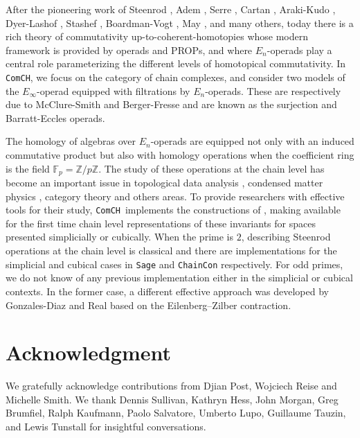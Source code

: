 \documentclass{amsart}
\newcommand{\comch}{\texttt{ComCH}}
\begin{document}
After the pioneering work of Steenrod \cite{Steenrod47, Steenrod62}, Adem \cite{Adem52}, Serre \cite{Serre53}, Cartan \cite{Cartan55}, Araki-Kudo \cite{ArakiKudo56}, Dyer-Lashof \cite{DyerLashof62}, Stashef \cite{Stasheff63}, Boardman-Vogt \cite{BoardmanVogt73}, May \cite{May70algebraic, May72geometry}, and many others, today there is a rich theory of commutativity up-to-coherent-homotopies whose modern framework is provided by operads and PROPs, and where $E_n$-operads play a central role parameterizing the different levels of homotopical commutativity. In \comch, we focus on the category of chain complexes, and consider two models of the $E_\infty$-operad equipped with filtrations by $E_n$-operads. These are respectively due to McClure-Smith \cite{McClureSmith03} and Berger-Fresse \cite{BergerFresse04} and are known as the surjection and Barratt-Eccles operads.

The homology of algebras over $E_n$-operads are equipped not only with an induced commutative product but also with homology operations when the coefficient ring is the field $\mathbb F_p = \mathbb Z/ p\mathbb Z$.
The study of these operations at the chain level has become an important issue in topological data analysis \cite{medina2018persistence}, condensed matter physics \cite{Kapustin2017}, category theory \cite{medina2020globular} and others areas. To provide researchers with effective tools for their study, \comch\, implements the constructions of \cite{medina2020chain}, making available for the first time chain level representations of these invariants for spaces presented simplicially or cubically. When the prime is $2$, describing Steenrod operations at the chain level is classical and there are implementations for the simplicial \cite{GonReal1999} and cubical \cite{Pilarczyk2016} cases in \texttt{Sage} \cite{sage} and \texttt{ChainCon} \cite{chaincon} respectively. For odd primes, we do not know of any previous implementation either in the simplicial or cubical contexts. In the former case, a different effective approach was developed by Gonzales-Diaz and Real \cite{GonReal2003, GonReal2005} based on the Eilenberg–Zilber contraction.

\section*{Acknowledgment}
We gratefully acknowledge contributions from Djian Post, Wojciech Reise and Michelle Smith. We thank Dennis Sullivan, Kathryn Hess, John Morgan, Greg Brumfiel, Ralph Kaufmann, Paolo Salvatore, Umberto Lupo, Guillaume Tauzin, and Lewis Tunstall for insightful conversations.
\end{document}
